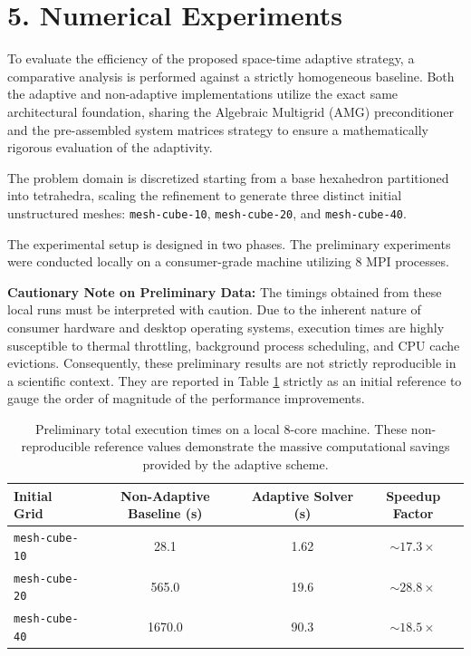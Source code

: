 \documentclass[
  11pt,
]{article}
\begin{document}
\section{5. Numerical Experiments}

To evaluate the efficiency of the proposed space-time adaptive strategy, a comparative analysis is performed against a strictly homogeneous baseline. Both the adaptive and non-adaptive implementations utilize the exact same architectural foundation, sharing the Algebraic Multigrid (AMG) preconditioner and the pre-assembled system matrices strategy to ensure a mathematically rigorous evaluation of the adaptivity.

The problem domain is discretized starting from a base hexahedron partitioned into tetrahedra, scaling the refinement to generate three distinct initial unstructured meshes: \texttt{mesh-cube-10}, \texttt{mesh-cube-20}, and \texttt{mesh-cube-40}. 

The experimental setup is designed in two phases. The preliminary experiments were conducted locally on a consumer-grade machine utilizing 8 MPI processes. 

\textbf{Cautionary Note on Preliminary Data:} The timings obtained from these local runs must be interpreted with caution. Due to the inherent nature of consumer hardware and desktop operating systems, execution times are highly susceptible to thermal throttling, background process scheduling, and CPU cache evictions. Consequently, these preliminary results are not strictly reproducible in a scientific context. They are reported in Table \ref{tab:local_results} strictly as an initial reference to gauge the order of magnitude of the performance improvements.

\begin{table}[H]
\centering
\begin{tabular}{|l|c|c|c|}
\hline
\textbf{Initial Grid} & \textbf{Non-Adaptive Baseline (s)} & \textbf{Adaptive Solver (s)} & \textbf{Speedup Factor} \\ \hline
\texttt{mesh-cube-10} & 28.1 & 1.62 & $\sim 17.3\times$ \\ \hline
\texttt{mesh-cube-20} & 565.0 & 19.6 & $\sim 28.8\times$ \\ \hline
\texttt{mesh-cube-40} & 1670.0 & 90.3 & $\sim 18.5\times$ \\ \hline
\end{tabular}
\caption{Preliminary total execution times on a local 8-core machine. These non-reproducible reference values demonstrate the massive computational savings provided by the adaptive scheme.}
\label{tab:local_results}
\end{table}
\end{document}
